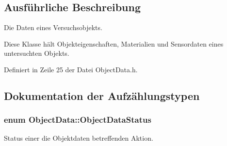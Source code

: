 \subsection{Ausführliche Beschreibung}
Die Daten eines Versuchsobjekts. 

Diese Klasse hält Objekteigenschaften, Materialien und Sensordaten eines untersuchten Objekts. 

Definiert in Zeile 25 der Datei Object\-Data.\-h.



\subsection{Dokumentation der Aufzählungstypen}
\hypertarget{classObjectData_a20e8cd3cd0f8af3b571b9393aa9e6484}{
\subsubsection[{Object\-Data\-Status}]{\setlength{\rightskip}{0pt plus 5cm}enum {\bf Object\-Data\-::\-Object\-Data\-Status}}}\label{classObjectData_a20e8cd3cd0f8af3b571b9393aa9e6484}


Status einer die Objektdaten betreffenden Aktion. 

